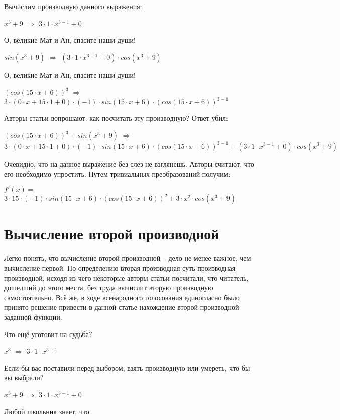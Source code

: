 \documentclass{article}
\begin{document}
Вычислим производную данного выражения:

$x ^ {3} + 9$ $\Rightarrow$ $3 \cdot 1 \cdot x ^ {3 - 1} + 0$

О, великие Мат и Ан, спасите наши души!

$ sin (x ^ {3} + 9)$ $\Rightarrow$ $(3 \cdot 1 \cdot x ^ {3 - 1} + 0) \cdot  cos (x ^ {3} + 9)$

О, великие Мат и Ан, спасите наши души!

$( cos (15 \cdot x + 6)) ^ {3}$ $\Rightarrow$ $3 \cdot (0 \cdot x + 15 \cdot 1 + 0) \cdot (-1) \cdot  sin (15 \cdot x + 6) \cdot ( cos (15 \cdot x + 6)) ^ {3 - 1}$

Авторы статьи вопрошают: как посчитать эту производную? Ответ убил:

$( cos (15 \cdot x + 6)) ^ {3} +  sin (x ^ {3} + 9)$ $\Rightarrow$ $3 \cdot (0 \cdot x + 15 \cdot 1 + 0) \cdot (-1) \cdot  sin (15 \cdot x + 6) \cdot ( cos (15 \cdot x + 6)) ^ {3 - 1} + (3 \cdot 1 \cdot x ^ {3 - 1} + 0) \cdot  cos (x ^ {3} + 9)$

Очевидно, что на данное выражение без слез не взглянешь. Авторы считают, что его необходимо упростить. Путем тривиальных преобразований получим:

$f'(x) = $ $3 \cdot 15 \cdot (-1) \cdot  sin (15 \cdot x + 6) \cdot ( cos (15 \cdot x + 6)) ^ {2} + 3 \cdot x ^ {2} \cdot  cos (x ^ {3} + 9)$

\section{Вычисление второй производной}

Легко понять, что вычисление второй производной -- дело не менее важное, чем вычисление первой. По определению вторая производная суть производная производной, исходя из чего некоторые авторы статьи посчитали, что читатель, дошедший до этого места, без труда вычислит вторую производную самостоятельно. Всё же, в ходе всенародного голосования единогласно было принято решение привести в данной статье нахождение второй производной заданной функции.

Что ещё уготовит на судьба?

$x ^ {3}$ $\Rightarrow$ $3 \cdot 1 \cdot x ^ {3 - 1}$

Если бы вас поставили перед выбором, взять производную или умереть, что бы вы выбрали?

$x ^ {3} + 9$ $\Rightarrow$ $3 \cdot 1 \cdot x ^ {3 - 1} + 0$

Любой школьник знает, что
\end{document}

